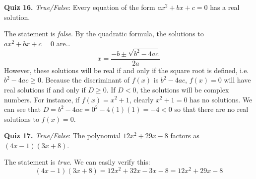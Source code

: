 \documentclass[11pt,letterpaper]{article}
\begin{document}
\noindent\textbf{Quiz 16.} \textit{True/False}: Every equation of the form $ax^2 + bx + c= 0$ has a real solution. \pspace

\sol The statement is \textit{false}. By the quadratic formula, the solutions to $ax^2 + bx + c= 0$ are\dots
	\[
	x= \dfrac{-b \pm \sqrt{b^2 - 4ac}}{2a}
	\]
However, these solutions will be real if and only if the square root is defined, i.e. $b^2 - 4ac \geq 0$. Because the discriminant of $f(x)$ is $b^2 - 4ac$, $f(x)= 0$ will have real solutions if and only if $D \geq 0$. If $D < 0$, the solutions will be complex numbers. For instance, if $f(x)= x^2 + 1$, clearly $x^2 + 1= 0$ has no solutions. We can see that $D= b^2 - 4ac= 0^2 - 4(1)(1)= -4 < 0$ so that there are no real solutions to $f(x)= 0$. \pvspace{1.5cm}



\noindent\textbf{Quiz 17.} \textit{True/False}: The polynomial $12x^2 + 29x - 8$ factors as $(4x - 1)(3x + 8)$. \pspace

\sol The statement is \textit{true}. We can easily verify this:
	\[
	(4x - 1)(3x + 8)= 12x^2 + 32x - 3x - 8= 12x^2 + 29x - 8
	\]
\end{document}
